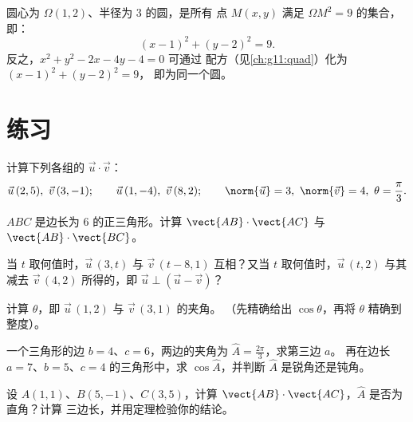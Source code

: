 \begin{example}[圆的方程]\label{ex:g11:scal:circle}
圆心为 $\Omega(1, 2)$、半径为 $3$ 的圆，是所有
点 $M(x,y)$ 满足 $\Omega M^2 = 9$ 的集合，即：
\[
(x - 1)^2 + (y - 2)^2 = 9 .
\]
反之，$x^2 + y^2 - 2x - 4y - 4 = 0$ 可通过
配方（见\cref{ch:g11:quad}）化为 $(x-1)^2 + (y-2)^2 = 9$，
即为同一个圆。
\end{example}

\section{练习}

\begin{exercise}[$\star$]\label{exo:g11:scal:1}
计算下列各组的 $\vec u \cdot \vec v$：
\[
\vec u\,(2, 5),\ \vec v\,(3, -1); \qquad
\vec u\,(1, -4),\ \vec v\,(8, 2); \qquad
\norm{\vec u} = 3,\ \norm{\vec v} = 4,\ \theta = \frac{\pi}{3} .
\]
\end{exercise}

\begin{exercise}[$\star$]\label{exo:g11:scal:2}
$ABC$ 是边长为 $6$ 的正三角形。计算
$\vect{AB} \cdot \vect{AC}$ 与 $\vect{AB} \cdot \vect{BC}$。
\end{exercise}

\begin{exercise}[$\star$]\label{exo:g11:scal:3}
当 $t$ 取何值时，$\vec u\,(3, t)$ 与 $\vec v\,(t - 8, 1)$
互相？又当 $t$ 取何值时，$\vec u\,(t, 2)$ 与其减去
$\vec v\,(4, 2)$ 所得的，即 $\vec u \perp (\vec u - \vec v)$？
\end{exercise}

\begin{exercise}[$\star$]\label{exo:g11:scal:4}
计算 $\theta$，即 $\vec u\,(1, 2)$ 与 $\vec v\,(3, 1)$ 的夹角。
（先精确给出 $\cos\theta$，再将 $\theta$ 精确到整度）。
\end{exercise}

\begin{exercise}[$\star\star$]\label{exo:g11:scal:5}
一个三角形的边 $b = 4$、$c = 6$，两边的夹角为
$\widehat A = \frac{2\pi}{3}$，求第三边 $a$。
再在边长 $a = 7$、$b = 5$、$c = 4$ 的三角形中，求
$\cos\widehat A$，并判断 $\widehat A$ 是锐角还是钝角。
\end{exercise}

\begin{exercise}[$\star\star$]\label{exo:g11:scal:6}
设 $A(1, 1)$、$B(5, -1)$、$C(3, 5)$，计算
$\vect{AB} \cdot \vect{AC}$，$\widehat A$ 是否为直角？计算
三边长，并用定理检验你的结论。
\end{exercise}

